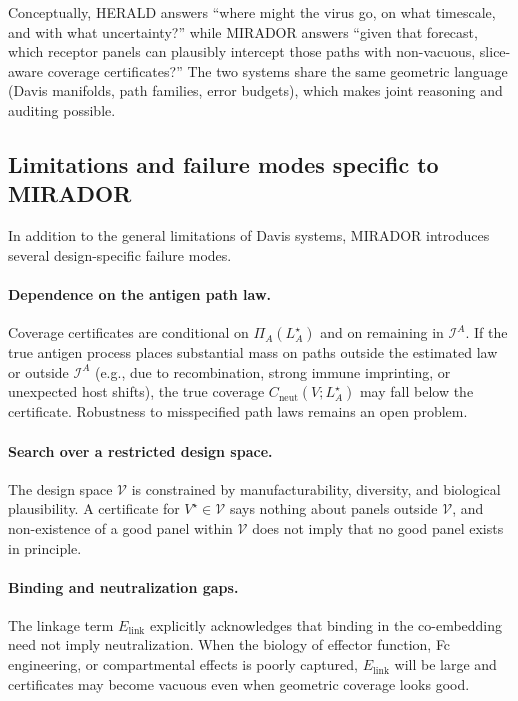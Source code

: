\documentclass[11pt]{article}
\begin{document}
Conceptually, HERALD answers ``where might the virus go, on what timescale, and with what
uncertainty?'' while MIRADOR answers ``given that forecast, which receptor panels can plausibly
intercept those paths with non-vacuous, slice-aware coverage certificates?'' The two systems share
the same geometric language (Davis manifolds, path families, error budgets), which makes joint
reasoning and auditing possible.

\subsection{Limitations and failure modes specific to MIRADOR}

In addition to the general limitations of Davis systems, MIRADOR introduces several design-specific
failure modes.

\paragraph{Dependence on the antigen path law.}
Coverage certificates are conditional on $\Pi_A(L_A^\star)$ and on remaining in
$\mathcal{I}^A$. If the true antigen process places substantial mass on paths outside the estimated
law or outside $\mathcal{I}^A$ (e.g., due to recombination, strong immune imprinting, or unexpected
host shifts), the true coverage $C_{\mathrm{neut}}(V;L_A^\star)$ may fall below the certificate.
Robustness to misspecified path laws remains an open problem.

\paragraph{Search over a restricted design space.}
The design space $\mathcal{V}$ is constrained by manufacturability, diversity, and biological
plausibility. A certificate for $V^\star \in \mathcal{V}$ says nothing about panels outside
$\mathcal{V}$, and non-existence of a good panel within $\mathcal{V}$ does not imply that no good
panel exists in principle.

\paragraph{Binding and neutralization gaps.}
The linkage term $E_{\mathrm{link}}$ explicitly acknowledges that binding in the co-embedding need
not imply neutralization. When the biology of effector function, Fc engineering, or compartmental
effects is poorly captured, $E_{\mathrm{link}}$ will be large and certificates may become vacuous
even when geometric coverage looks good.
\end{document}
